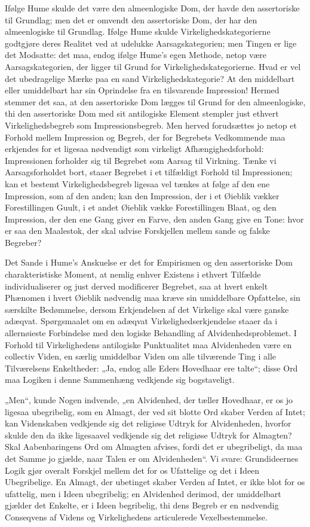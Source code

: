 \documentclass[12pt]{book}
\newcommand{\opage}[1]{\marginnote{\footnotesize\textit{[#1]}}}
\begin{document}
Ifølge Hume skulde det være den almeenlogiske Dom,
der havde den assertoriske til Grundlag; men det er omvendt
\opage{189}den assertoriske Dom, der har den almeenlogiske til Grundlag.
Ifølge Hume skulde Virkelighedskategorierne godtgjøre deres
Realitet ved at udelukke Aarsagskategorien; men Tingen er
lige det Modsatte: det maa, endog ifølge Hume's egen Methode,
netop være Aarsagskategorien, der ligger til Grund for Virkelighedskategorierne.
Hvad er vel det ubedragelige Mærke paa
en sand Virkelighedskategorie? At den middelbart eller umiddelbart
har sin Oprindelse fra en tilsvarende Impression! Hermed
stemmer det saa, at den assertoriske Dom lægges til
Grund for den almeenlogiske, thi den assertoriske Dom med
sit antilogiske Element stempler just ethvert Virkelighedsbegreb
som Impressionsbegreb. Men herved forudsættes jo netop et
Forhold mellem Impression og Begreb, der for Begrebets
Vedkommende maa erkjendes for et ligesaa nødvendigt som
virkeligt Afhængighedsforhold: Impressionen forholder sig til
Begrebet som Aarsag til Virkning. Tænke vi Aarsagsforholdet
bort, staaer Begrebet i et tilfældigt Forhold til Impressionen;
kan et bestemt Virkelighedsbegreb ligesaa vel tænkes
at følge af den ene Impression, som af den anden; kan den
Impression, der i et Øieblik vækker Forestillingen Guult, i
et andet Øieblik vække Forestillingen Blaat, og den Impression,
der den ene Gang giver en Farve, den anden Gang give en
Tone: hvor er saa den Maalestok, der skal udvise Forskjellen
mellem sande og falske Begreber?

Det Sande i Hume's Anskuelse er det for Empirismen
og den assertoriske Dom charakteristiske Moment, at nemlig
enhver Existens i ethvert Tilfælde individualiserer og just derved
modificerer Begrebet, saa at hvert enkelt Phænomen i hvert
Øieblik nødvendig maa kræve sin umiddelbare Opfattelse, sin
særskilte Bedømmelse, dersom Erkjendelsen af det Virkelige
skal være ganske adæqvat. Spørgsmaalet om en adæqvat
Virkelighedserkjendelse staaer da i allernøieste Forbindelse med
den logiske Behandling af Alvidenhedsproblemet. I Forhold
til Virkelighedens antilogiske Punktualitet maa Alvidenheden
\opage{190}være en collectiv Viden, en særlig umiddelbar Viden om alle
tilværende Ting i alle Tilværelsens Enkeltheder: „Ja, endog
alle Eders Hovedhaar ere talte“; disse Ord maa Logiken i
denne Sammenhæng vedkjende sig bogstaveligt.

„Men“, kunde Nogen indvende, „en Alvidenhed, der
tæller Hovedhaar, er os jo ligesaa ubegribelig, som en Almagt,
der ved sit blotte Ord skaber Verden af Intet; kan Videnskaben
vedkjende sig det religiøse Udtryk for Alvidenheden,
hvorfor skulde den da ikke ligesaavel vedkjende sig det religiøse
Udtryk for Almagten? Skal Aabenbaringens Ord om Almagten
afvises, fordi det er ubegribeligt, da maa det Samme jo
gjælde, naar Talen er om Alvidenheden“. Vi svare: Grundideernes
Logik gjør overalt Forskjel mellem det for os Ufattelige
og det i Ideen Ubegribelige. En Almagt, der ubetinget
skaber Verden af Intet, er ikke blot for os ufattelig, men i
Ideen ubegribelig; en Alvidenhed derimod, der umiddelbart
gjælder det Enkelte, er i Ideen begribelig, thi dens Begreb
er en nødvendig Conseqvens af Videns og Virkelighedens articulerede
Vexelbestemmelse.
\end{document}
